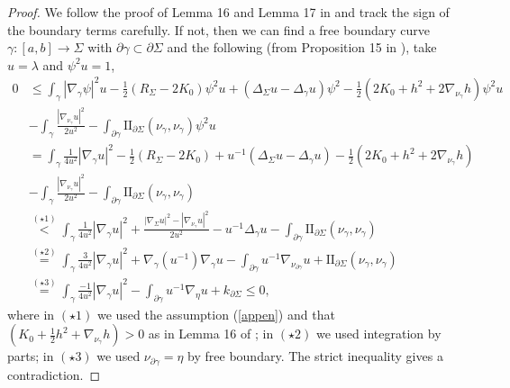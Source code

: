 \documentclass[12pt]{amsart}
\newcommand{\sff}{\mathrm{I\!I}}
\numberwithin{equation}{section}
\begin{document}
\begin{proof}
	We follow the proof of Lemma 16 and Lemma 17 in \cite{ChodoLi2020-GeneralizedSoapBubbles} and track the sign of the boundary terms carefully. If not, then we can find a free boundary curve $\gamma:[a,b]\rightarrow \Sigma$ with $\partial \gamma\subset \partial \Sigma$ and the following (from Proposition 15 in \cite{ChodoLi2020-GeneralizedSoapBubbles}), take $u=\lambda$ and $\psi^2u=1$,
	\begin{align*}
		0&\leq \int_{\gamma}|\nabla_{\gamma} \psi|^2u-\frac{1}{2}(R_{\Sigma}-2K_0)\psi^2 u+(\Delta_{\Sigma} u-\Delta_{\gamma}u)\psi^2-\frac{1}{2}(2K_0+h^2+2\nabla_{\nu_{\gamma}}h)\psi^2u\\
		&-\int_{\gamma}\frac{|\nabla_{\nu_{\gamma}}u|^2}{2u^2} -\int_{\partial\gamma}\sff_{\partial \Sigma}(\nu_{\gamma},\nu_{\gamma})\psi^2 u \\
		&=\int_{\gamma}\frac{1}{4u^2}|\nabla_{\gamma}u|^2-\frac{1}{2}(R_{\Sigma}-2K_0)+u^{-1}(\Delta_{\Sigma}u-\Delta_{\gamma}u)-\frac{1}{2}(2K_0+h^2+2\nabla_{\nu_{\gamma}}h)\\
		&-\int_{\gamma}\frac{|\nabla_{\nu_{\gamma}}u|^2}{2u^2} -\int_{\partial\gamma}\sff_{\partial \Sigma}(\nu_{\gamma},\nu_{\gamma})\\
		&\stackrel{(\star 1)}{<}\int_{\gamma} \frac{1}{4u^2}|\nabla_{\gamma}u|^2+\frac{|\nabla_{\Sigma}u|^2-|\nabla_{\nu_{\gamma}}u|^2}{2u^2}-u^{-1}\Delta_{\gamma}u-\int_{\partial\gamma}\sff_{\partial \Sigma}(\nu_{\gamma},\nu_{\gamma})\\
		&\stackrel{(\star 2)}{=}\int_{\gamma}\frac{3}{4u^2}|\nabla_{\gamma}u|^2+\nabla_{\gamma}(u^{-1})\nabla_{\gamma}u-\int_{\partial \gamma}u^{-1}\nabla_{\nu_{\partial\gamma}}u+\sff_{\partial \Sigma}(\nu_{\gamma},\nu_{\gamma})\\
		&\stackrel{(\star 3)}{=}\int_{\gamma}\frac{-1}{4u^2}|\nabla_{\gamma}u|^2- \int_{\partial \gamma}u^{-1}\nabla_{\eta}u+k_{\partial \Sigma}\leq  0,
	\end{align*}
	where in $(\star 1)$ we used the assumption (\ref{appen}) and that $(K_0+\frac{1}{2}h^2+\nabla_{\nu_{\gamma}}h)>0$ as in Lemma 16 of \cite{ChodoLi2020-GeneralizedSoapBubbles}; in $(\star 2)$ we used integration by parts; in $(\star 3)$ we used $\nu_{\partial \gamma}=\eta$ by free boundary. The strict inequality gives a contradiction.  
\end{proof}





\end{document}
